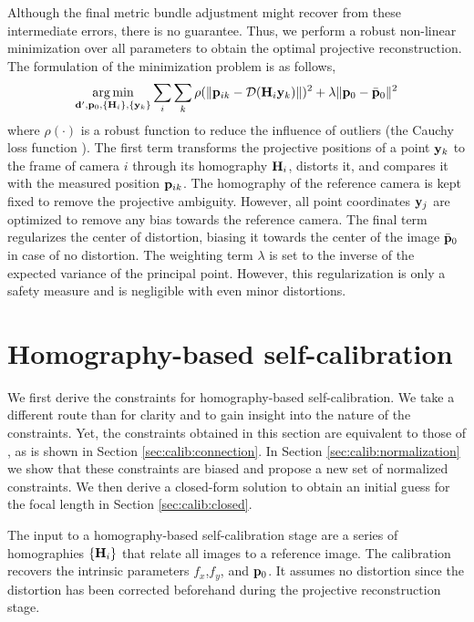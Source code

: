 \documentclass[10pt,twocolumn,letterpaper]{article}
\begin{document}
Although the final metric bundle adjustment might recover from these intermediate errors, there is no guarantee. Thus, we perform a robust non-linear minimization \cite{ceres-solver} over all parameters to obtain the optimal projective reconstruction. The formulation of the minimization problem is as follows, 
%
\begin{align}
\argmin_{\dv',\pv_0,\lbrace \Hm_i \rbrace, \lbrace \yv_k \rbrace} 
%
\sum_i \sum_k \rho(\norm{\pv_{ik} - \Distortion(\Hm_i \yv_k)})^2 + \lambda\norm{\pv_0 - \bar{\pv}_0}^2
\end{align}
%
where $\rho(\cdot)$ is a robust function to reduce the influence of outliers (\eg the Cauchy loss function \cite{ceres-solver}). The first term transforms the projective positions of a point $\mathbf{y}_k$ to the frame of camera $i$ through its homography $\mathbf{H}_i$, distorts it, and compares it with the measured position $\mathbf{p}_{ik}$. The homography of the reference camera is kept fixed to remove the projective ambiguity. However, all point coordinates $\mathbf{y}_j$ are optimized to remove any bias towards the reference camera. The final term regularizes the center of distortion, biasing it towards the center of the image $\bar{\mathbf{p}}_0$ in case of no distortion. The weighting term $\lambda$ is set to the inverse of the expected variance of the principal point. However, this regularization is only a safety measure and is negligible with even minor distortions.

\section{Homography-based self-calibration}
\label{sec:calib}

We first derive the constraints for homography-based self-calibration. We take a different route than \cite{bocquillon2006} for clarity and to gain insight into the nature of the constraints. Yet, the constraints obtained in this section are equivalent to those of \cite{bocquillon2006}, as is shown in Section \ref{sec:calib:connection}. In Section \ref{sec:calib:normalization} we show that these constraints are biased and propose a new set of normalized constraints. We then derive a closed-form solution to obtain an initial guess for the focal length in Section \ref{sec:calib:closed}.

The input to a homography-based self-calibration stage are a series of homographies $\lbrace \mathbf{H}_i \rbrace$ that relate all images to a reference image. The calibration recovers the intrinsic parameters $f_x$,$f_y$, and $\mathbf{p}_0$. It assumes no distortion since the distortion has been corrected beforehand during the projective reconstruction stage.
\end{document}

